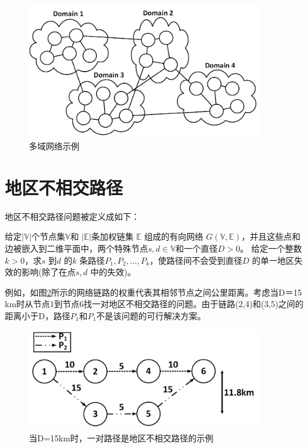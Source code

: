 \begin{figure}[htbp]
  \centering
  \includegraphics[width=4.0in]{figures/MultiDomainNetwork}
  \caption{多域网络示例}
  \label{fig:MultiDomainNetwork}
\end{figure}
\section{地区不相交路径}
地区不相交路径问题被定义成如下：

\begin{definition}[地区不相交路径问题]
给定$|\mathbb{V}|$个节点集$\mathbb{V}$和 $|\mathbb{E}|$条加权链集 $\mathbb{E}$ 组成的有向网络 $G(\mathbb{V},\mathbb{E})$，并且这些点和边被嵌入到二维平面中，两个特殊节点$s,d\in\mathbb{V}$和一个直径$D>0$。 给定一个整数$k>0$，求$s$ 到$d$ 的$k$ 条路径$P_1,P_2,\ldots,P_k$，使路径间不会受到直径$D$ 的单一地区失效的影响(除了在点$s,d$ 中的失效)。
\end{definition}

例如，如图\ref{fig:RegionDisjointPath}所示的网络链路的权重代表其相邻节点之间公里距离。考虑当D＝15 km时从节点1到节点6找一对地区不相交路径的问题。由于链路(2,4)和(3,5)之间的距离小于D，路径$P_1$和$P_1$不是该问题的可行解决方案。


\begin{figure}[htbp]
  \centering
  \includegraphics[width=4.0in]{figures/RegionDisjointPath}
  \caption{当D=15km时，一对路径是地区不相交路径的示例}
  \label{fig:RegionDisjointPath}
\end{figure}
